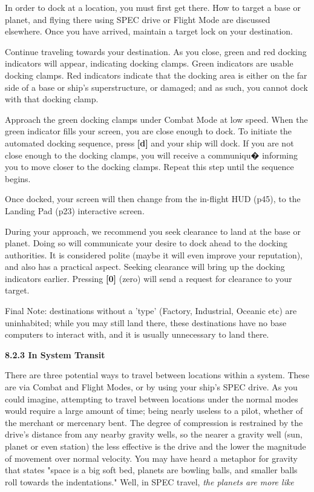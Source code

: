 \documentclass{article}
\begin{document}
In order to dock at a location, you must first get there. How to target a base or planet, and flying there using SPEC drive or Flight Mode are discussed elsewhere. Once you have arrived, maintain a target lock on your destination. 

Continue traveling towards your destination. As you close, green and red docking indicators will appear, indicating docking clamps. Green indicators are usable docking clamps. Red indicators indicate that the docking area is either on the far side of a base or ship's superstructure, or damaged; and as such, you cannot dock with that docking clamp. 

Approach the green docking clamps under Combat Mode at low speed. When the green indicator fills your screen, you are close enough to dock. To initiate the automated docking sequence, press \textbf{[d] }and your ship will dock. If you are not close enough to the docking clamps, you will receive a communiqu� informing you to move closer to the docking clamps. Repeat this step until the sequence begins.  

Once docked, your screen will then change from the in-flight HUD (p45), to the Landing Pad (p23) interactive screen. 

During your approach, we recommend you seek clearance to land at the base or planet. Doing so will communicate your desire to dock ahead to the docking authorities. It is considered polite (maybe it will even improve your reputation), and also has a practical aspect. Seeking clearance will bring up the docking indicators earlier. Pressing \textbf{[0]} (zero) will send a request for clearance to your target. 

Final Note: destinations without a 'type' (Factory, Industrial, Oceanic etc) are uninhabited; while you may still land there, these destinations have no base computers to interact with, and it is usually unnecessary to land there. 



\textbf{8.2.3 In System Transit }

There are three potential ways to travel between locations within a system.  These are via Combat and Flight Modes, or by using your ship's SPEC drive. As you could imagine, attempting to travel between locations under the normal modes would require a large amount of time; being nearly useless to a pilot, whether of the merchant or mercenary bent. The degree of compression is restrained by the drive's distance from any nearby gravity wells, so the nearer a gravity well (sun, planet or even station) the less effective is the drive and the lower the magnitude of movement over normal velocity. You may have heard a metaphor for gravity that states "space is a big soft bed, planets are bowling balls, and smaller balls roll towards the indentations." Well, in SPEC travel, \textit{the planets are more like }
\end{document}
